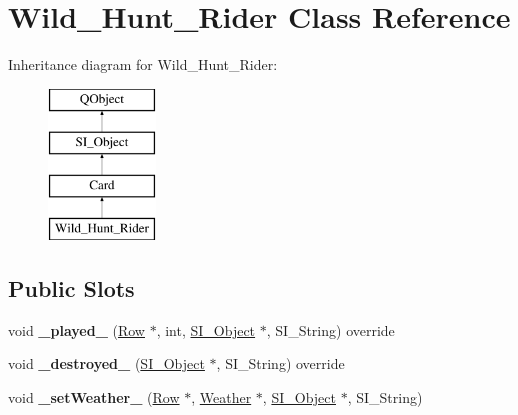 \hypertarget{class_wild___hunt___rider}{}\section{Wild\+\_\+\+Hunt\+\_\+\+Rider Class Reference}
\label{class_wild___hunt___rider}
Inheritance diagram for Wild\+\_\+\+Hunt\+\_\+\+Rider\+:\begin{figure}[H]
\begin{center}
\leavevmode
\includegraphics[height=4.000000cm]{class_wild___hunt___rider}
\end{center}
\end{figure}
\subsection*{Public Slots}
\begin{DoxyCompactItemize}
\item 
\mbox{\label{class_wild___hunt___rider_a22ebf681468dfcc34cb8e20f0eda8757}} 
void {\bfseries \+\_\+played\+\_\+} (\hyperlink{class_card_set}{Row} $\ast$, int, \hyperlink{class_s_i___object}{S\+I\+\_\+\+Object} $\ast$, S\+I\+\_\+\+String) override
\item 
\mbox{\label{class_wild___hunt___rider_a1ed3f1fe1ca1f41373dec7b29c5fea63}} 
void {\bfseries \+\_\+destroyed\+\_\+} (\hyperlink{class_s_i___object}{S\+I\+\_\+\+Object} $\ast$, S\+I\+\_\+\+String) override
\item 
\mbox{\label{class_wild___hunt___rider_a393ae9bf418a53586f045828fb308340}} 
void {\bfseries \+\_\+set\+Weather\+\_\+} (\hyperlink{class_card_set}{Row} $\ast$, \hyperlink{class_weather}{Weather} $\ast$, \hyperlink{class_s_i___object}{S\+I\+\_\+\+Object} $\ast$, S\+I\+\_\+\+String)
\end{DoxyCompactItemize}
